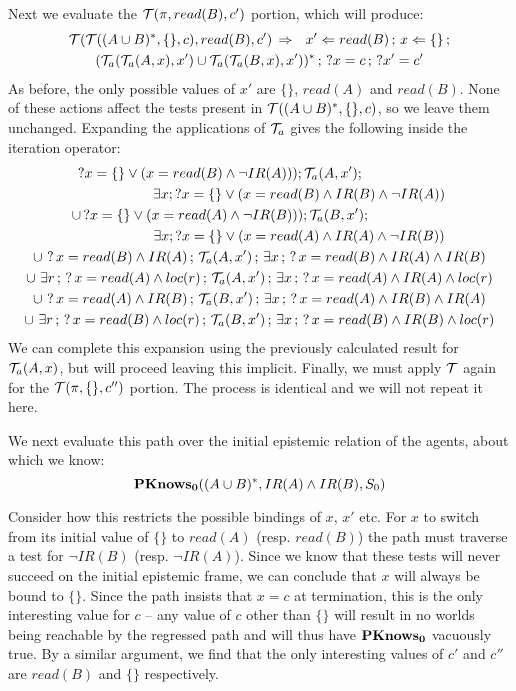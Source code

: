 Next we evaluate the $\mathcal{T}(\pi,read(B),c')$ portion, which will produce:\begin{multline*}
\mathcal{T}(\mathcal{T}((A\cup B)^{*},\{\},c),read(B),c')\,\Rightarrow\,\,\,\, x'\Leftarrow read(B)\,;\, x\Leftarrow\{\}\,;\\
(\mathcal{T}_{a}(\mathcal{T}_{a}(A,x),x')\cup\mathcal{T}_{a}(\mathcal{T}_{a}(B,x),x'))^{*}\,;\,?x=c\,;\,?x'=c'\end{multline*}
 As before, the only possible values of $x'$ are $\{\}$, $read(A)$
and $read(B)$. None of these actions affect the tests present in
$\mathcal{T}((A\cup B)^{*},\{\},c)$, so we leave them unchanged. Expanding
the applications of $\mathcal{T}_{a}$ gives the following inside the iteration
operator: \begin{multline*}
?x=\{\}\vee(x=read(B)\wedge\neg IR(A)));\mathcal{T}_{a}(A,x');\,\,\,\,\,\,\,\,\,\,\,\,\,\,\,\,\,\,\,\,\,\,\,\,\,\,\,\,\,\,\,\,\,\,\\
\,\,\,\,\,\,\,\,\,\,\,\,\,\,\,\,\,\,\,\,\,\,\,\,\,\,\,\,\,\,\,\,\,\,\exists x;?x=\{\}\vee(x=read(B)\wedge IR(B)\wedge\neg IR(A))\\
\cup\,?x=\{\}\vee(x=read(A)\wedge\neg IR(B)));\mathcal{T}_{a}(B,x');\,\,\,\,\,\,\,\,\,\,\,\,\,\,\,\,\,\,\,\,\,\,\,\,\,\,\,\,\,\,\,\,\,\,\\
\,\,\,\,\,\,\,\,\,\,\,\,\,\,\,\,\,\,\,\,\,\,\,\,\,\,\,\,\,\,\,\,\,\,\exists x;?x=\{\}\vee(x=read(A)\wedge IR(A)\wedge\neg IR(B))\\
\cup\,\,?\, x=read(B)\wedge IR(A)\,;\,\mathcal{T}_{a}(A,x')\,;\,\exists x\,;\,?\, x=read(B)\wedge IR(A)\wedge IR(B)\\
\cup\,\,\exists r\,;\,?\, x=read(A)\wedge loc(r)\,;\,\mathcal{T}_{a}(A,x')\,;\,\exists x\,;\,?\, x=read(A)\wedge IR(A)\wedge loc(r)\\
\cup\,\,?\, x=read(A)\wedge IR(B)\,;\,\mathcal{T}_{a}(B,x')\,;\,\exists x\,;\,?\, x=read(A)\wedge IR(B)\wedge IR(A)\\
\cup\,\,\exists r\,;\,?\, x=read(B)\wedge loc(r)\,;\,\mathcal{T}_{a}(B,x')\,;\,\exists x\,;\,?\, x=read(B)\wedge IR(B)\wedge loc(r)\end{multline*}
 We can complete this expansion using the previously calculated result
for $\mathcal{T}_{a}(A,x)$, but will proceed leaving this implicit. Finally,
we must apply $\mathcal{T}$ again for the $\mathcal{T}(\pi,\{\},c'')$ portion.
The process is identical and we will not repeat it here.

We next evaluate this path over the initial epistemic relation of
the agents, about which we know:\[
\mathbf{PKnows_{0}}((A\cup B)^{*},IR(A)\wedge IR(B),S_{0})\]


Consider how this restricts the possible bindings of $x$, $x'$ etc.
For $x$ to switch from its initial value of $\{\}$ to $read(A)$
(resp. $read(B)$) the path must traverse a test for $\neg IR(B)$
(resp. $\neg IR(A)$). Since we know that these tests will never succeed
on the initial epistemic frame, we can conclude that $x$ will always
be bound to $\{\}$. Since the path insists that $x=c$ at termination,
this is the only interesting value for $c$ -- any value of $c$ other
than $\{\}$ will result in no worlds being reachable by the regressed
path and will thus have $\mathbf{PKnows_{0}}$ vacuously true. By a similar argument,
we find that the only interesting values of $c'$ and $c''$ are $read(B)$
and $\{\}$ respectively.

